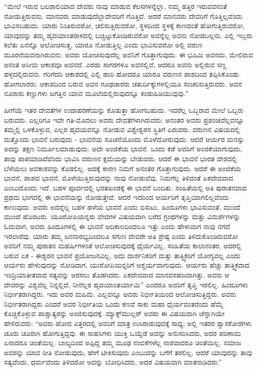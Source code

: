 “ಮೇಲೆ ಇರುವ ಬಲಶಾಲಿಯಾದ ದೇವರು ನಾವು ಮಾಡುವ ಕೆಲಸಗಳನ್ನೆಲ್ಲಾ, ನಮ್ಮ ಹತ್ತಿರ ಇರುವವನಂತೆ ನೋಡುತ್ತಿರುವನು. ಮಾನವರು ಮಾಡುವುದೆಲ್ಲಾ\break ದೇವರಿಗೆ ಗೊತ್ತಿದೆ. ಆದರೆ ಮಾನವರು ದೇವರಿಗೆ ಗೊತ್ತಿಲ್ಲವೆಂದು ಭಾವಿಸಬಹುದು. ಯಾರು ನಿಂತಿರುವರೋ, ಚಲಿಸುತ್ತಿರುವರೋ, ಸ್ಥಳದಿಂದ ಸ್ಥಳಕ್ಕೆ ಕಾಣದಂತೆ ಹೋಗುತ್ತಿರುವರೋ, ಯಾವುದನ್ನು ತಮ್ಮ ಹೃದಯಾಂತರಾಳದಲ್ಲಿ ಬಚ್ಚಿಟ್ಟುಕೊಂಡಿರುವರೋ ಅವನ್ನೆಲ್ಲ ಅವನು ನೋಡಬಲ್ಲನು. ಎಲ್ಲಿ ಇಬ್ಬರು ಕಲೆತು ಏನನ್ನೊ ಆಲೋಚಿಸುತ್ತ, ಯಾರೂ ನೋಡುತ್ತಿಲ್ಲ ಎಂದು ಭಾವಿಸುವರೋ ಅಲ್ಲಿ ವರುಣ ಮೂರನೆಯವನಾಗಿರುವನು. ಅವರು ಯೋಚಿಸುವುದೆಲ್ಲ ಅವನಿಗೆ ಗೊತ್ತಾಗುವುದು. ಈ ಭೂಮಿ ಅವನದು, ಮೇಲಿರುವ ಅನಂತ ಅಸೀಮ ಆಕಾಶವೂ ಅವನದೆ. ಎರಡು ಸಾಗರಗಳೂ ಅವನಲ್ಲಿವೆ, ಆದರೂ ಅವನು ಅಲ್ಲಿರುವ ಸಣ್ಣ ಹಳ್ಳದಲ್ಲಿರುವನು. ಗರಿಗೆದರಿ ಆಕಾಶದಲ್ಲಿ ಎಲ್ಲಿ ಹಾರಿ ಹೋದರೂ ಯಾರೂ ವರುಣನ ಪಾಶದಿಂದ ತಪ್ಪಿಸಿಕೊಂಡು ಹೋಗಲಾರರು. ಆಕಾಶದಿಂದ ಬರುವ ಅವನ ಗೂಢಚಾರರು ಚತುರ್ದಿಕ್ಕುಗಳಲ್ಲಿಯೂ ಸಂಚರಿಸುತ್ತಿರುವರು. ಅವನ ನೂರಾರು ಕಣ್ಣುಗಳು ಜಗತ್ತಿನ ಯಾವ ಮೂಲೆಯಲ್ಲಿರುವುದನ್ನೂ ಕಂಡುಹಿಡಿಯುವುವು."

ಹೀಗೆಯೆ ಇತರ ದೇವತೆಗಳ ಉದಾಹರಣೆಯನ್ನು ಕೊಡುತ್ತಾ ಹೋಗಬಹುದು. ಇವರೆಲ್ಲ ಒಬ್ಬರಾದ ಮೇಲೆ ಒಬ್ಬರು ಬರುವರು. ಎಲ್ಲರಿಗೂ ಇದೇ ಗತಿ-ಮೊದಲು ಅವರು ದೇವತೆಗಳಾಗಿರುವರು; ಅನಂತರ ಅವರು ಪ್ರಪಂಚವೆಲ್ಲವನ್ನೂ ತಮ್ಮಲ್ಲಿ ಒಳಕೊಳ್ಳುವ, ಎಲ್ಲರ ಹೃದಯವನ್ನೂ ನೋಡುವ ವಿಶ್ವೇಶ್ವರನ ಸ್ಥಿತಿಗೆ ಏರುವರು. ವರುಣನ ವಿಷಯದಲ್ಲಿ ಮತ್ತೊಂದು ಭಾವನೆ ಬರುವುದು - ಭಾವನೆಯ ಸೂಚನೆಯೊಂದು ಮೊಳೆದೋರುವುದು. ಆದರೆ ಆರ್ಯರ ಮನಸ್ಸು ಅದನ್ನು ತಕ್ಷಣ ನಿರ್ಮೂಲ\break ಮಾಡುವುದು. ಅದೇ ಅಂಜಿಕೆಯ ಭಾವನೆ. ಒಂದು ಕಡೆ ಅವರಿಗೆ ಅಂಜಿಕೆಯಾಗುವುದು, ತಾವು ಪಾಪಮಾಡಿದೆವೆಂದು ಭಾವಿಸಿ ವರುಣನ ಕ್ಷಮೆಯನ್ನು ಬೇಡುವರು. ಆದರೆ ಈ ಭಾವನೆ ಭಾರತ ದೇಶದಲ್ಲಿ ಬೆಳೆಯಲು ಅವಕಾಶವನ್ನು ಕೊಡಲಿಲ್ಲ. ಅದಕ್ಕೆ ಕಾರಣ ನಿಮಗೆ ಅನಂತರ ಗೊತ್ತಾಗುವುದು. ಆದರೆ ಈ ಅಂಜಿಕೆಯ ಭಾವನೆ, ಪಾಪದ ಭಾವನೆ, ಮೊಳೆಯುತ್ತಿರುವುದನ್ನು ನಾವು ನೋಡುವೆವು. ನಿಮಗೆಲ್ಲ ತಿಳಿದಂತೆ ಏಕದೇವವಾದ ಎಂಬುದೊಂದು ಇದೆ. ಬಹಳ ಪೂರ್ವದಲ್ಲಿ ಭರತಖಂಡಕ್ಕೆ ಈ ಭಾವನೆ ಬಂದಿತು. ಸಂಹಿತೆಯಲ್ಲಿ ಅತಿ ಪುರಾತನವಾದ ಪ್ರಥಮ ಭಾಗದಲ್ಲಿ ಈ ಭಾವನೆಯನ್ನು ನೋಡುತ್ತೇವೆ. ಆದರೆ ಇದರಿಂದ ಆರ್ಯರಿಗೆ ತೃಪ್ತಿಯಾಗಲಿಲ್ಲವೆಂದು ಕಾಣುವುದು. ಅವರು ಅದನ್ನೆಲ್ಲ ಬಹಳ ಹಳೆಯ ಭಾವನೆ ಎಂದು ಬಿಸುಟು, ಹಿಂದೂಗಳು ಭಾವಿಸುವಂತೆ, ಮುಂದೆ ಮುಂದೆ ಹೊರಟರು. ಯೂರೋಪಿಯನ್ನರು ವೇದಗಳ ವಿಷಯವಾಗಿ ಬರೆದ ಗ್ರಂಥಗಳನ್ನು ಮತ್ತು ವಿಮರ್ಶೆಗಳನ್ನು ಓದುವಾಗ, ಅವರು ಹಿಂದೂಗಳಲ್ಲಿ ಈ ಭಾವನೆ ಆದಿಕಾಲದಿಂದಲೂ ಇತ್ತು ಎಂದು ಹೇಳುವಾಗ ನಾವು ನಗದೆ ಇರಲಾರೆವು. ಯಾರು ತಮ್ಮ ಜನನಾರಭ್ಯದಿಂದಲೂ ಸಗುಣ ದೇವರೇ ಅತಿ ಶ್ರೇಷ್ಠ ಎಂದು ತಿಳಿದುಕೊಂಡಿರುವರೋ ಅವರಿಗೆ ನಮ್ಮ ಪುರಾತನ ಮಹರ್ಷಿಗಳಂತೆ ಆಲೋಚಿಸುವುದಕ್ಕೆ ಧೈರ್ಯವಿಲ್ಲ. ಸಂಹಿತೆಯ ಕಾಲಾನಂತರ, ಅದರಲ್ಲಿ ಬರುವ ಏಕ - ಈಶ್ವರನ ಭಾವನೆ ಪ್ರಯೋಜನವಿಲ್ಲ, ಅದು ದಾರ್ಶನಿಕರಿಗೆ ಮತ್ತು ತಾತ್ತ್ವಿಕರಿಗೆ ಯೋಗ್ಯವಲ್ಲ ಎಂದು ಆರ್ಯರು ಹೇಳುವುದನ್ನು ನೋಡಿದಾಗ, ಯುರೋಪಿಯನ್ನರಿಗೆ ಆಶ್ಚರ್ಯವಾಗುವುದು. ಆರ್ಯರು ಹೆಚ್ಚು ತಾತ್ತ್ವಿಕವಾದ ಇಂದ್ರಿಯಾತೀತವಾದ ಸತ್ಯವನ್ನು ಅರಸಲು ತೊಡಗಿದರು. ಏಕದೇವವಾದ ಮಾನವಸಹಜವಾಗಿತ್ತು. ಅವರು ಆ ದೇವರನ್ನು ವಿಶ್ವವೆಲ್ಲ ನಿನ್ನಲ್ಲಿದೆ, ನೀನೆಲ್ಲರ ಹೃದಯಾಂತರ್ಯಾಮಿ” ಎಂದರೂ ಅವರಿಗೆ ತೃಪ್ತಿ ಇರಲಿಲ್ಲ. ಹಿಂದೂಗಳು ನಿರ್ಭೀತರಾಗಿದ್ದರು. ಇದು ಅವರ ಮಹಿಮೆ. ಎಲ್ಲವನ್ನೂ ಅವರು ನಿರ್ಭೀತಿಯಿಂದ ಆಲೋಚಿಸುತ್ತಿದ್ದರು. ಅವರು ನಿರ್ಭೀತರಾಗಿದ್ದರು ಎಂದರೆ ಅವರ ನಿರ್ಭೀತಿಯ ಒಂದು ಕಣವೆ ಸಾಕು ಮಹಾ ಧೈರ್ಯವಂತರೆಂದು ಹೆಮ್ಮೆ ಕೊಚ್ಚಿಕೊಳ್ಳುವ ಪಾಶ್ಚಾತ್ಯರನ್ನು ಅಂಜಿಸುವುದಕ್ಕೆ. ಮ್ಯಾಕ್ಸ್‌ಮುಲ್ಲರ್ ಅವರು ಈ ವಿಷಯವಾಗಿ ಚೆನ್ನಾಗಿಯೇ ಹೇಳಿರುವರು: “ಅವರು ಹೋದ ಎತ್ತರದಲ್ಲಿ ಅವರಿಗೆ ಮಾತ್ರ ಉಸಿರಾಡುವುದಕ್ಕೆ ಸಾಧ್ಯ; ಅಲ್ಲಿ ಇತರರ ಶ್ವಾಸಕೋಶಗಳು ಚೂರು ಚೂರಾಗಿ ಹೋಗುತ್ತಿದ್ದವು. ಈ ಸಾಹಸಿಗಳು ಯುಕ್ತಿ ಒಯ್ದೆಡೆ ಅದನ್ನು ಅನುಸರಿಸಿದರು, ಅದರ ಪರಿಣಾಮ ಏನಾದರೂ ಚಿಂತೆಯಿಲ್ಲ. ಬಾಲ್ಯದಿಂದ ಅಪ್ಪಿದ್ದ ತಮ್ಮ ಮೂಢ ನಂಬಿಕೆಗಳೆಲ್ಲ ನಾಶವಾದರೂ ಚಿಂತೆಯಿಲ್ಲ. ಸಮಾಜ ಅವರನ್ನು ಯಾವ ರೀತಿ ನೋಡುವುದು, ಹೇಗೆ ಟೀಕಿಸುವುದು ಎಂಬುದನ್ನು ಬಗೆಗೆ ತರಲಿಲ್ಲ. ಆದರೆ ಯಾವುದನ್ನು ತಾವು ಸತ್ಯವೆಂದು, ಧರ್ಮವೆಂದು ತಿಳಿದರೋ ಅದನ್ನು ಬೋಧಿಸಿದರು, ಅದರ ವಿಷಯವಾಗಿ ಮಾತನಾಡಿದರು.”

